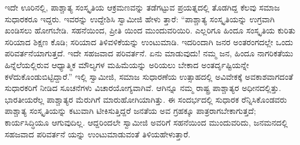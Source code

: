 ಇದೇ ಊರಿನಲ್ಲಿ, ಪಾಶ್ಚಾತ್ಯ ಸಂಸ್ಕೃತಿಯ ಆಕ್ರಮಣವನ್ನು ತಡೆಗಟ್ಟುವ ಪ್ರಯತ್ನದಲ್ಲಿ ತೊಡಗಿದ್ದ ಕೆಲವು ಸಮಾಜ ಸುಧಾರಕರೂ ಇದ್ದರು. ಇವರನ್ನು ಉದ್ದೇಶಿಸಿ ಸ್ವಾಮೀಜಿ ಹೇಳು ತ್ತಾರೆ: “ಪಾಶ್ಚಾತ್ಯ ಸಂಸ್ಕೃತಿಯನ್ನು ಉಗ್ರವಾಗಿ ಖಂಡಿಸಲು ಹೋಗಬೇಡಿ. ಸಹನೆಯಿಂದ, ಪ್ರೀತಿ ಯಿಂದ ಮುಂದುವರಿಯಿರಿ. ಎಲ್ಲರಿಗೂ ಹಿಂದೂ ಸಂಸ್ಕೃತಿಯ ಕುರಿತು ಸರಿಯಾದ ಶಿಕ್ಷಣ ಕೊಡಿ; ಸರಿಯಾದ ತಿಳಿವಳಿಕೆಯನ್ನು ಉಂಟುಮಾಡಿ. ಇದರಿಂದಾಗಿ ಜನರ ಅಂತರಂಗದಲ್ಲೇ ಒಂದು ಪರಿವರ್ತನೆಯಾಗುತ್ತದೆ. ಇದೇ ಸಹಜವಾದ ಪರಿವರ್ತನೆ. ಏನು ಮಾಡುವುದು! ನಮ್ಮ ಜನ, ಹಿಂದೂ ನಾಗರಿಕತೆಯು ಹಿನ್ನೆಲೆಯಲ್ಲಿರುವ ಆಧ್ಯಾತ್ಮಿಕ ಮೌಲ್ಯಗಳ ಮಹಿಮೆಯನ್ನು ಅರಿಯಲು ಬೇಕಾದ ಅಂತರ್ದೃಷ್ಟಿಯನ್ನೇ ಕಳೆದುಕೊಂಡುಬಿಟ್ಟಿದ್ದಾರೆ.” ಇಲ್ಲಿ ಸ್ವಾಮೀಜಿ, ಸಮಾಜ ಸುಧಾರಣೆಯ ಉತ್ಸಾಹದಲ್ಲಿ ಅವಿವೇಕಕ್ಕೆ ಅವಕಾಶವಾಗದಂತೆ ಸುಧಾರಕರಿಗೆ ನೀಡಿದ ಸೂಚನೆಗಳು ವಿಚಾರಯೋಗ್ಯವಾಗಿವೆ. ಆಗಿನ್ನೂ ನಮ್ಮ ರಾಷ್ಟ್ರ ಪಾಶ್ಚಾತ್ಯರ ಅಧೀನದಲ್ಲಿತ್ತು. ಭಾರತೀಯರೆಲ್ಲ ಪಾಶ್ಚಾತ್ಯರ ಮೆರುಗಿಗೆ ಮಾರುಹೋಗಿಯಾಗಿತ್ತು. ಈ ಸಂದರ್ಭದಲ್ಲಿ ಸುಧಾರಕ ರೆನ್ನಿಸಿಕೊಂಡವರು ಪಾಶ್ಚಾತ್ಯ ಸಂಸ್ಕೃತಿಯನ್ನು ಕಟುವಾಗಿ ಟೀಕಿಸುತ್ತಿದ್ದರೆ ಜನತೆಯ ಅವ ಗ್ರಹಕ್ಕೂ ಪಾತ್ರರಾಗಬೇಕಾಗುತ್ತದೆ; ಕಾರ್ಯಸಿದ್ಧಿಯೂ ಆಗುವುದಿಲ್ಲ. ಆದ್ದರಿಂದಲೇ ಸ್ವಾಮೀಜಿ ಅವರಿಗೆ ಸಹನೆಯಿಂದ ಮುಂದುವರಿದು, ಜನಮನದಲ್ಲಿ ಸಹಜವಾದ ಪರಿವರ್ತನೆ ಯನ್ನು ಉಂಟುಮಾಡುವಂತೆ ತಿಳಿಯಹೇಳುತ್ತಾರೆ.

